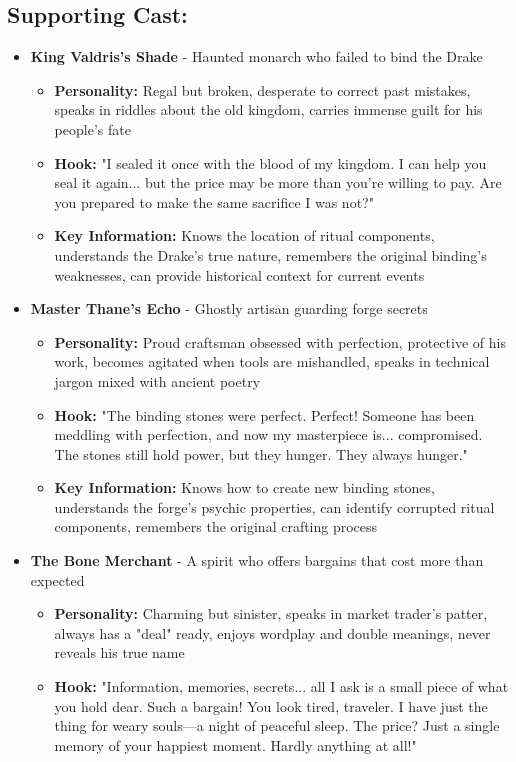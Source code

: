 \documentclass[11pt]{article}
\begin{document}
\subsection{Supporting Cast:}
\begin{itemize}
\item \textbf{King Valdris's Shade} - Haunted monarch who failed to bind the Drake
  \begin{itemize}
  \item \textbf{Personality:} Regal but broken, desperate to correct past mistakes, speaks in riddles about the old kingdom, carries immense guilt for his people's fate
  \item \textbf{Hook:} "I sealed it once with the blood of my kingdom. I can help you seal it again... but the price may be more than you're willing to pay. Are you prepared to make the same sacrifice I was not?"
  \item \textbf{Key Information:} Knows the location of ritual components, understands the Drake's true nature, remembers the original binding's weaknesses, can provide historical context for current events
  \end{itemize}
\item \textbf{Master Thane's Echo} - Ghostly artisan guarding forge secrets
  \begin{itemize}
  \item \textbf{Personality:} Proud craftsman obsessed with perfection, protective of his work, becomes agitated when tools are mishandled, speaks in technical jargon mixed with ancient poetry
  \item \textbf{Hook:} "The binding stones were perfect. Perfect! Someone has been meddling with perfection, and now my masterpiece is... compromised. The stones still hold power, but they hunger. They always hunger."
  \item \textbf{Key Information:} Knows how to create new binding stones, understands the forge's psychic properties, can identify corrupted ritual components, remembers the original crafting process
  \end{itemize}
\item \textbf{The Bone Merchant} - A spirit who offers bargains that cost more than expected
  \begin{itemize}
  \item \textbf{Personality:} Charming but sinister, speaks in market trader's patter, always has a "deal" ready, enjoys wordplay and double meanings, never reveals his true name
  \item \textbf{Hook:} "Information, memories, secrets... all I ask is a small piece of what you hold dear. Such a bargain! You look tired, traveler. I have just the thing for weary souls—a night of peaceful sleep. The price? Just a single memory of your happiest moment. Hardly anything at all!"

\end{itemize}
\end{itemize}
\end{document}
